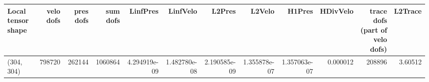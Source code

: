 \begin{tabular}{lrrrrrrrrrrr}
\toprule
Local tensor shape &  velo dofs &  pres dofs &  sum dofs &     LinfPres &     LinfVelo &       L2Pres &       L2Velo &       H1Pres &  HDivVelo &  trace dofs (part of velo dofs) &  L2Trace \\
\midrule
        (304, 304) &     798720 &     262144 &   1060864 & 4.294919e-09 & 1.482780e-08 & 2.190585e-09 & 1.355878e-07 & 1.357063e-07 &  0.000012 &                          208896 &  3.60512 \\
\bottomrule
\end{tabular}
